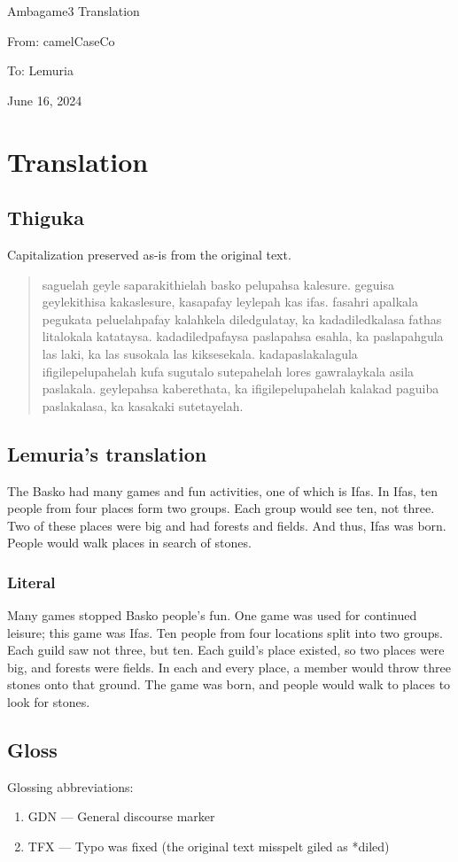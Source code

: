 \documentclass{thiguka}
\begin{document}
Ambagame3 Translation

From: camelCaseCo

To: Lemuria

June 16, 2024

\section{Translation}
\subsection{Thiguka}
Capitalization preserved as-is from the original text.

\begin{quotation}
saguelah geyle saparakithielah basko pelupahsa kalesure.
geguisa geylekithisa kakaslesure, kasapafay leylepah kas ifas.
fasahri apalkala pegukata peluelahpafay kalahkela diledgulatay, ka kadadiledkalasa fathas litalokala katataysa.
kadadiledpafaysa paslapahsa esahla, ka paslapahgula las laki, ka las susokala las kiksesekala.
kadapaslakalagula ifigilepelupahelah kufa sugutalo sutepahelah lores gawralaykala asila paslakala.
geylepahsa kaberethata, ka ifigilepelupahelah kalakad paguiba paslakalasa, ka kasakaki sutetayelah.
\end{quotation}


\subsection{Lemuria's translation}
The Basko had many games and fun activities, one of which is Ifas.
In Ifas, ten people from four places form two groups.
Each group would see ten, not three.
Two of these places were big and had forests and fields.
And thus, Ifas was born. People would walk places in search of stones.

\subsubsection{Literal}
Many games stopped Basko people's fun.
One game was used for continued leisure; this game was Ifas.
Ten people from four locations split into two groups.
Each guild saw not three, but ten.
Each guild's place existed, so two places were big, and forests were fields.
In each and every place, a member would throw three stones onto that ground.
The game was born, and people would walk to places to look for stones.


\subsection{Gloss}
Glossing abbreviations:
\begin{enumerate}
    \item GDN --- General discourse marker
    \item TFX --- Typo was fixed (the original text misspelt giled as *diled)
\end{enumerate}
\end{document}
